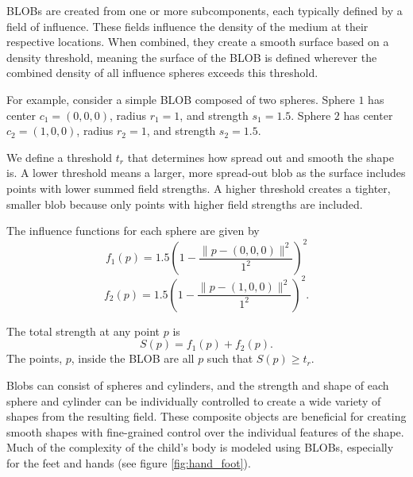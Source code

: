 \documentclass{article}
\begin{document}
BLOBs are created from one or more subcomponents, each typically defined by a field of influence. These fields influence the density of the medium at their respective locations. When combined, they create a smooth surface based on a density threshold, meaning the surface of the BLOB is defined wherever the combined density of all influence spheres exceeds this threshold.

For example, consider a simple BLOB composed of two spheres. Sphere $1$ has center $c_1 = (0, 0, 0)$, radius $r_1 = 1$, and strength $s_1 = 1.5$. Sphere $2$ has  center $c_2 = (1, 0, 0)$, radius $r_2 = 1$, and strength $s_2 = 1.5$. 

We define a threshold $t_r$ that determines how spread out and smooth the shape is. A lower threshold means a larger, more spread-out blob as the surface includes points with lower summed field strengths. A higher threshold creates a tighter, smaller blob because only points with higher field strengths are included.

The influence functions for each sphere are given by
$$
f_1(p) = 1.5 \left( 1 - \frac{\| p - (0, 0, 0) \|^2}{1^2} \right)^2 
$$
$$
f_2(p) = 1.5 \left( 1 - \frac{\| p - (1, 0, 0) \|^2}{1^2} \right)^2 
.$$

The total strength at any point $p$ is
$$
S(p) = f_1(p) + f_2(p).
$$
The points, $p$, inside the BLOB are all $p$ such that $S(p) \geq t_r$.

Blobs can consist of spheres and cylinders, and the strength and shape of each sphere and cylinder can be individually controlled to create a wide variety of shapes from the resulting field.  These composite objects are beneficial for creating smooth shapes with fine-grained control over the individual features of the shape. Much of the complexity of the child's body is modeled using BLOBs, especially for the feet and hands (see figure \ref{fig:hand_foot}). 
\end{document}
